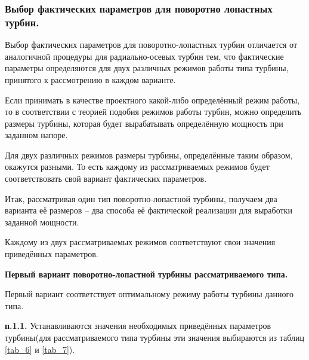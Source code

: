 
\subsubsection{Выбор фактических параметров для поворотно лопастных турбин.}


Выбор фактических параметров для поворотно-лопастных турбин отличается от аналогичной процедуры для радиально-осевых турбин тем, что фактические параметры определяются для двух различных режимов работы типа турбины, принятого к рассмотрению в каждом варианте.

Если принимать в качестве проектного какой-либо определённый режим работы, то в соответствии с теорией подобия режимов работы турбин, можно определить размеры турбины, которая будет вырабатывать определённую мощность при заданном напоре.

Для двух различных режимов размеры турбины, определённые таким образом, окажутся разными. То есть каждому из рассматриваемых режимов будет соответствовать свой вариант фактических параметров.

\vspace{0.5cm}

Итак, рассматривая один тип поворотно-лопастной турбины, получаем два варианта её размеров -- два способа её фактической реализации для выработки заданной мощности.

Каждому из двух рассматриваемых режимов соответствуют свои значения приведённых параметров.

\begin{center}
\textbf{Первый вариант поворотно-лопастной турбины рассматриваемого типа.}
\end{center}

Первый вариант соответствует оптимальному режиму работы турбины данного типа.

\vspace{0.5cm}

\textbf{п.1.1.} Устанавливаются значения необходимых приведённых параметров турбины(для рассматриваемого типа турбины эти значения выбираются из  таблиц \ref{tab_6} и \ref{tab_7}).

